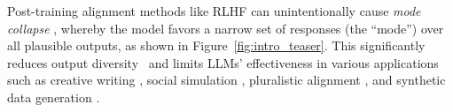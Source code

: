 Post-training alignment methods like RLHF %
can unintentionally cause \emph{mode collapse} \citep{janus2022modecollapse,omahony2024attributing,kirk2024understandingeffectsrlhfllm}, whereby the model favors a narrow set of responses (the ``mode'') over all plausible outputs, as shown in Figure~\ref{fig:intro_teaser}. This significantly reduces output diversity~\citep{padmakumar_does_2024,west2025basemodelsbeataligned}
and limits LLMs' effectiveness in various applications such as creative writing \citep{lu2025aihumanityssalieriquantifying}, social simulation \citep{anthis2025llmsocialsimulationspromising}, pluralistic alignment \citep{kirk2024prismalignmentdatasetparticipatory}, and synthetic data generation \citep{zhu2025bareleveragingbaselanguage}. %


